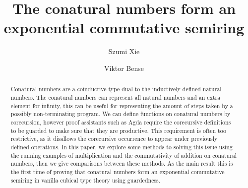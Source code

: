 \documentclass[sigplan, screen, natbib=false, review]{acmart}
\begin{document}
\title{The conatural numbers form an exponential commutative semiring}

\author{Szumi Xie}

\author{Viktor Bense}


\begin{abstract}
  Conatural numbers are a coinductive type dual to the inductively defined
  natural numbers. The conatural numbers can represent all natural numbers and
  an extra element for infinity, this can be useful for representing the amount
  of steps taken by a possibly non-terminating program. We can define functions
  on conatural numbers by corecursion, however proof assistants such as Agda
  require the corecursive definitions to be guarded to make sure that they are
  productive. This requirement is often too restrictive, as it disallows the
  corecursive occurrence to appear under previously defined operations. In this
  paper, we explore some methods to solving this issue using the running
  examples of multiplication and the commutativity of addition on conatural
  numbers, then we give comparisons between these methods. As the main result
  this is the first time of proving that conatural numbers form an exponential
  commutative semiring in vanilla cubical type theory using guardedness.


\end{abstract}
\end{document}
